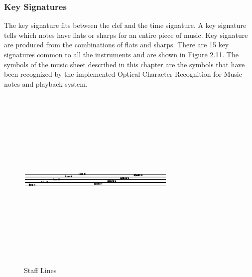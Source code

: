 \documentclass[journal]{IEEEtran}
\begin{document}
\subsubsection{Key Signatures}
The key signature fits between the clef and the time signature. A key signature tells which notes
have flats or sharps for an entire piece of music. Key signature are produced from the combinations
of flats and sharps. There are 15 key signatures common to all the instruments and are shown in
Figure 2.11. The symbols of the music sheet described in this chapter are the symbols that have been recognized by the implemented Optical Character Recognition for Music notes and playback system.

\begin{figure}
\includegraphics[width=3in,height=3.5in,clip,keepaspectratio]{resources/images/staff_line}
\centering
\caption{Staff Lines}
\end{figure}


%
%
\end{document}
